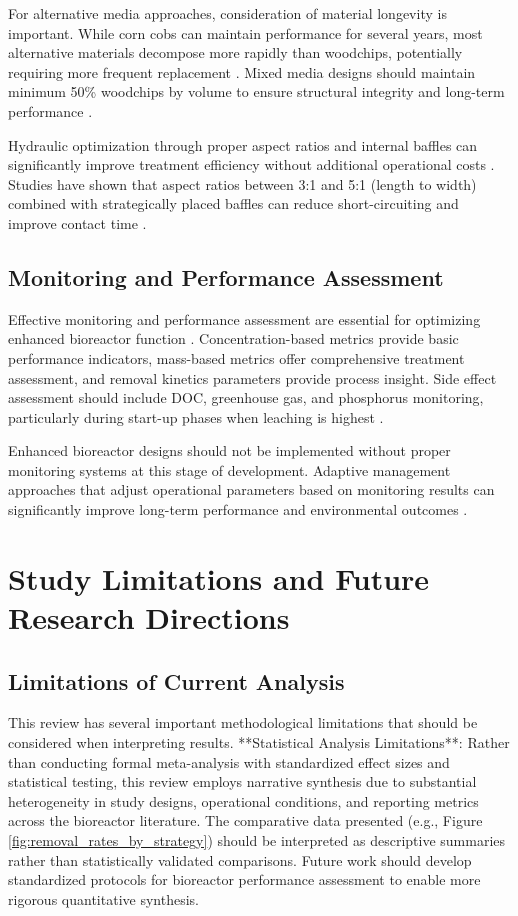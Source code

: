 \documentclass[12pt,a4paper]{article}
\begin{document}
For alternative media approaches, consideration of material longevity is important. While corn cobs can maintain performance for several years, most alternative materials decompose more rapidly than woodchips, potentially requiring more frequent replacement \citep{new_ref_2}. Mixed media designs should maintain minimum 50\% woodchips by volume to ensure structural integrity and long-term performance \citep{new_ref_4}.

Hydraulic optimization through proper aspect ratios and internal baffles can significantly improve treatment efficiency without additional operational costs \citep{RN309}. Studies have shown that aspect ratios between 3:1 and 5:1 (length to width) combined with strategically placed baffles can reduce short-circuiting and improve contact time \citep{RN309}.

\subsection{Monitoring and Performance Assessment}

Effective monitoring and performance assessment are essential for optimizing enhanced bioreactor function \citep{RN310, RN312}. Concentration-based metrics provide basic performance indicators, mass-based metrics offer comprehensive treatment assessment, and removal kinetics parameters provide process insight. Side effect assessment should include DOC, greenhouse gas, and phosphorus monitoring, particularly during start-up phases when leaching is highest \citep{RN625, RN1181}.

Enhanced bioreactor designs should not be implemented without proper monitoring systems at this stage of development. Adaptive management approaches that adjust operational parameters based on monitoring results can significantly improve long-term performance and environmental outcomes \citep{RN310}.

\section{Study Limitations and Future Research Directions}

\subsection{Limitations of Current Analysis}

This review has several important methodological limitations that should be considered when interpreting results. **Statistical Analysis Limitations**: Rather than conducting formal meta-analysis with standardized effect sizes and statistical testing, this review employs narrative synthesis due to substantial heterogeneity in study designs, operational conditions, and reporting metrics across the bioreactor literature. The comparative data presented (e.g., Figure \ref{fig:removal_rates_by_strategy}) should be interpreted as descriptive summaries rather than statistically validated comparisons. Future work should develop standardized protocols for bioreactor performance assessment to enable more rigorous quantitative synthesis.
\end{document}
